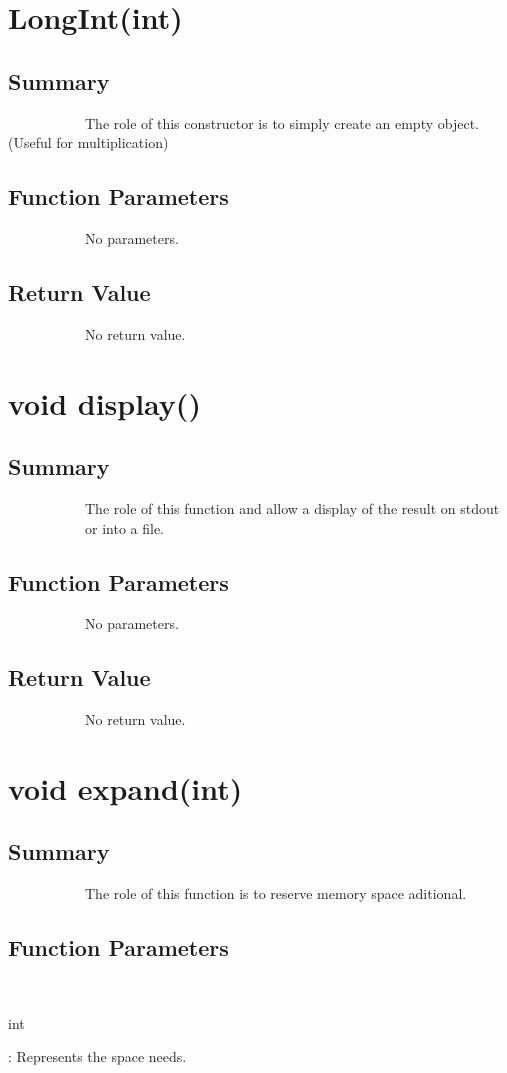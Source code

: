 \documentclass[11pt]{report}
\begin{document}
    \section{LongInt(int)}
   
	\subsection{Summary}
~~~~~~~~~~~The role of this constructor is to simply create an empty object. (Useful for multiplication)
	\subsection{Function Parameters}
~~~~~~~~~~~No parameters.
	\subsection{Return Value}
~~~~~~~~~~~No return value.
    
    \section{void display()}
  
	\subsection{Summary}
~~~~~~~~~~~The role of this function and allow a display of the result on stdout\\
~~~~~~~~~~~or into a file.
	\subsection{Function Parameters}
~~~~~~~~~~~No parameters.
	\subsection{Return Value}
~~~~~~~~~~~No return value.
	  
    \section{void expand(int)}
  
	\subsection{Summary}
~~~~~~~~~~~The role of this function is to reserve memory space aditional.
	\subsection{Function Parameters}
~~~~~~~~~~~\begin{bf}int\end{bf}: 
   Represents the space needs.
\end{document}
